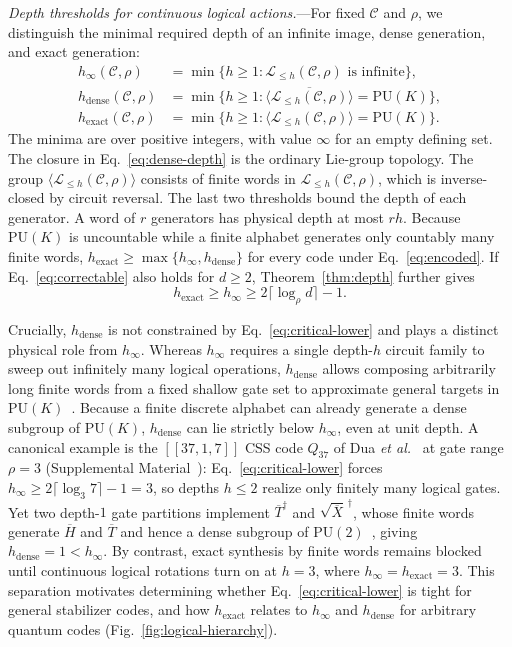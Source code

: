 \documentclass[aps,prl,reprint,notitlepage,nofootinbib,nobibnotes]{revtex4-2}
\newcommand{\PU}{\mathrm{PU}}
\begin{document}
\textit{Depth thresholds for continuous logical actions.}---For fixed $\mathcal C$ and $\rho$, we
distinguish the minimal required depth of an infinite image, dense generation, and exact generation:
\begin{align}
 h_\infty(\mathcal C,\rho)
 &=\min\{h\ge1:\mathcal L_{\le h}(\mathcal C,\rho)\text{ is infinite}\},
 \label{eq:critical-definition}\\
 h_{\mathrm{dense}}(\mathcal C,\rho)
 &=\min\{h\ge1:\overline{\langle \mathcal L_{\le h}(\mathcal C,\rho)\rangle}=\PU(K)\},
 \label{eq:dense-depth}\\
 h_{\mathrm{exact}}(\mathcal C,\rho)
 &=\min\{h\ge1:\langle \mathcal L_{\le h}(\mathcal C,\rho)\rangle=\PU(K)\}.
 \label{eq:exact-depth}
\end{align}
The minima are over positive integers, with value $\infty$ for an empty defining set. The closure
in Eq.~\eqref{eq:dense-depth} is the ordinary Lie-group topology. The group $\langle \mathcal
L_{\le h}(\mathcal C,\rho)\rangle$ consists of finite words in $\mathcal L_{\le h}(\mathcal
C,\rho)$, which is inverse-closed by circuit reversal. The last two thresholds bound the depth of
each generator. A word of $r$ generators has physical depth at most $rh$. Because $\PU(K)$ is
uncountable while a finite alphabet generates only countably many finite words,
$h_{\mathrm{exact}}\ge\max\{h_\infty,h_{\mathrm{dense}}\}$ for every code under
Eq.~\eqref{eq:encoded}. If Eq.~\eqref{eq:correctable} also holds for $d\ge2$,
Theorem~\ref{thm:depth} further gives
\begin{equation}\label{eq:critical-lower}
 h_{\mathrm{exact}}\ge h_\infty
 \ge2\lceil\log_\rho d\rceil-1.
\end{equation}

Crucially, $h_{\mathrm{dense}}$ is not constrained by Eq.~\eqref{eq:critical-lower} and plays a
distinct physical role from $h_\infty$. Whereas $h_\infty$ requires a single depth-$h$ circuit
family to sweep out infinitely many logical operations, $h_{\mathrm{dense}}$ allows composing
arbitrarily long finite words from a fixed shallow gate set to approximate general targets in
$\PU(K)$~\cite{Boykin,ZhuLavasaniBarkeshli}. Because a finite discrete alphabet can already
generate a dense subgroup of $\PU(K)$, $h_{\mathrm{dense}}$ can lie strictly below $h_\infty$, even
at unit depth. A canonical example is the $[[37,1,7]]$ CSS code $Q_{37}$ of Dua \emph{et
al.}~\cite{Dua} at gate range $\rho=3$ (Supplemental Material~\cite{Supplement}):
Eq.~\eqref{eq:critical-lower} forces $h_\infty\ge 2\lceil\log_3 7\rceil-1=3$, so depths $h\le2$
realize only finitely many logical gates. Yet two depth-$1$ gate partitions implement $\overline
T^\dagger$ and $\sqrt{\overline X}^{\,\dagger}$, whose finite words generate $\overline H$ and
$\overline T$ and hence a dense subgroup of $\PU(2)$~\cite{Boykin}, giving
$h_{\mathrm{dense}}=1<h_\infty$. By contrast, exact synthesis by finite words remains blocked until
continuous logical rotations turn on at $h=3$, where $h_\infty=h_{\mathrm{exact}}=3$. This
separation motivates determining whether Eq.~\eqref{eq:critical-lower} is tight for general
stabilizer codes, and how $h_{\mathrm{exact}}$ relates to $h_\infty$ and $h_{\mathrm{dense}}$ for
arbitrary quantum codes (Fig.~\ref{fig:logical-hierarchy}).
\end{document}
